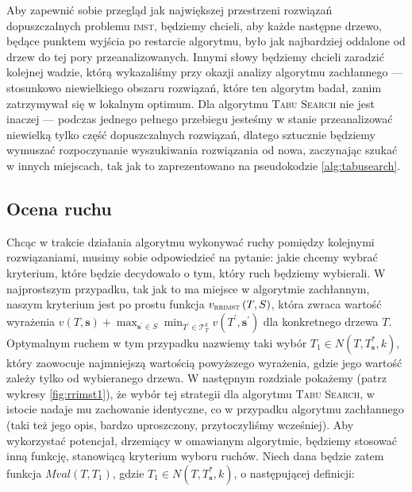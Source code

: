 Aby zapewnić sobie przegląd jak największej przestrzeni rozwiązań dopuszczalnych problemu \textsc{imst}, będziemy chcieli, aby każde następne drzewo, będące punktem wyjścia po restarcie algorytmu, było jak najbardziej oddalone od drzew do tej pory przeanalizowanych. Innymi słowy będziemy chcieli zaradzić kolejnej wadzie, którą wykazaliśmy przy okazji analizy algorytmu zachłannego --- stosunkowo niewielkiego obszaru rozwiązań, które ten algorytm badał, zanim zatrzymywał się w lokalnym optimum. Dla algorytmu \textsc{Tabu Search} nie jest inaczej --- podczas jednego pełnego przebiegu jesteśmy w stanie przeanalizować niewielką tylko część dopuszczalnych rozwiązań, dlatego sztucznie będziemy wymuszać rozpoczynanie wyszukiwania rozwiązania od nowa, zaczynając szukać w innych miejscach, tak jak to zaprezentowano na pseudokodzie \ref{alg:tabusearch}.

\subsection{Ocena ruchu}

Chcąc w trakcie działania algorytmu wykonywać ruchy pomiędzy kolejnymi rozwiązaniami, musimy sobie odpowiedzieć na pytanie: jakie chcemy wybrać kryterium, które będzie decydowało o tym, który ruch będziemy wybierali. W najprostszym przypadku, tak jak to ma miejsce w algorytmie zachłannym, naszym kryterium jest po prostu funkcja $v_{\textsc{rrimst}} \left( T, S \right)$, która zwraca wartość wyrażenia $v \left( T, \textbf{s} \right) + \max_{\textbf{s}^{\prime} \in S} \min_{T^{\prime} \in \mathcal{T}^{k}_{T}} v \left( T^{\prime}, \textbf{s}^{\prime} \right)$ dla konkretnego drzewa $T$. Optymalnym ruchem w tym przypadku nazwiemy taki wybór $T_{1} \in N \left( T, T^{\ast}_{\textbf{s}}, k \right)$, który zaowocuje najmniejszą wartością powyższego wyrażenia, gdzie jego wartość zależy tylko od wybieranego drzewa. W następnym rozdziale pokażemy (patrz wykresy \ref{fig:rrimst1}), że wybór tej strategii dla algorytmu \textsc{Tabu Search}, w istocie nadaje mu zachowanie identyczne, co w przypadku algorytmu zachłannego (taki też jego opis, bardzo uproszczony, przytoczyliśmy wcześniej). Aby wykorzystać potencjał, drzemiący w omawianym algorytmie, będziemy stosować inną funkcję, stanowiącą kryterium wyboru ruchów. Niech dana będzie zatem funkcja $Mval \left( T, T_{1} \right)$, gdzie $T_{1} \in N \left( T, T^{\ast}_{\textbf{s}}, k \right)$, o następującej definicji:

